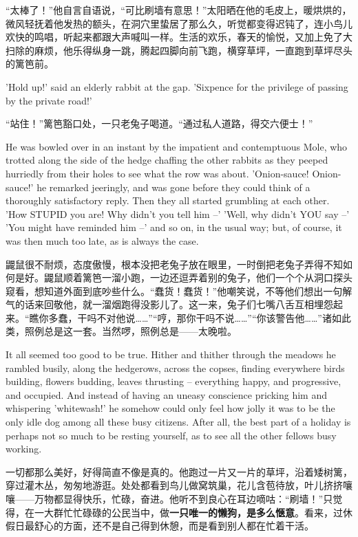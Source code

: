 {  	“太棒了！”他自言自语说，“可比刷墙有意思！”太阳晒在他的毛皮上，暖烘烘的，微风轻抚着他发热的额头，在洞穴里蛰居了那么久，听觉都变得迟钝了，连小鸟儿欢快的鸣唱，听起来都跟大声喊叫一样。生活的欢乐，春天的愉悦，又加上免了大扫除的麻烦，他乐得纵身一跳，腾起四脚向前飞跑，横穿草坪，一直跑到草坪尽头的篱笆前。
  	
  	'Hold up!' said an elderly rabbit at the gap. 'Sixpence for the privilege of passing by the private road!'
  	
  	“站住！”篱笆豁口处，一只老兔子喝道。“通过私人道路，得交六便士！”
  	
  	He was bowled over in an instant by the impatient and contemptuous Mole, who trotted along the side of the hedge chaffing the other rabbits as they peeped hurriedly from their holes to see what the row was about. 'Onion-sauce! Onion-sauce!' he remarked jeeringly, and was gone before they could think of a thoroughly satisfactory reply. Then they all started grumbling at each other. 'How STUPID you are! Why didn't you tell him --' 'Well, why didn't YOU say --' 'You might have reminded him --' and so on, in the usual way; but, of course, it was then much too late, as is always the case.
  	
  	鼹鼠很不耐烦，态度傲慢，根本没把老兔子放在眼里，一时倒把老兔子弄得不知如何是好。鼹鼠顺着篱笆一溜小跑，一边还逗弄着别的兔子，他们一个个从洞口探头窥看，想知道外面到底吵些什么。“蠢货！蠢货！”他嘲笑说，不等他们想出一句解气的话来回敬他，就一溜烟跑得没影儿了。这一来，兔子们七嘴八舌互相埋怨起来。“瞧你多蠢，干吗不对他说……”“哼，那你干吗不说……”“你该警告他……”诸如此类，照例总是这一套。当然啰，照例总是——太晚啦。
  	
  	It all seemed too good to be true. Hither and thither through the meadows he rambled busily, along the hedgerows, across the copses, finding everywhere birds building, flowers budding, leaves thrusting -- everything happy, and progressive, and occupied. And instead of having an uneasy conscience pricking him and whispering 'whitewash!' he somehow could only feel how jolly it was to be the only idle dog among all these busy citizens. After all, the best part of a holiday is perhaps not so much to be resting yourself, as to see all the other fellows busy working.
  	
  	一切都那么美好，好得简直不像是真的。他跑过一片又一片的草坪，沿着矮树篱，穿过灌木丛，匆匆地游逛。处处都看到鸟儿做窝筑巢，花儿含苞待放，叶儿挤挤嚷嚷——万物都显得快乐，忙碌，奋进。他听不到良心在耳边嘀咕：“刷墙！”只觉得，在一大群忙忙碌碌的公民当中，做\textbf{一只唯一的懒狗，是多么惬意}。看来，过休假日最舒心的方面，还不是自己得到休憩，而是看到别人都在忙着干活。
  	
}

